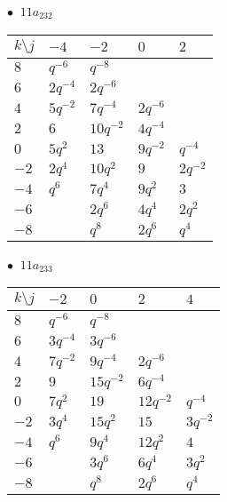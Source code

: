 \begin{minipage}{\linewidth}
$\bullet\ $ $11a_{232}$ \vspace{0.5em} \\
\begin{tabular}{l|llll}
$k \setminus j$ & $-4$ & $-2$ & $0$ & $2$ \\
\hline
$8$ & $q^{-6}$ & $q^{-8}$ &  &  \\
$6$ & $2q^{-4}$ & $2q^{-6}$ &  &  \\
$4$ & $5q^{-2}$ & $7q^{-4}$ & $2q^{-6}$ &  \\
$2$ & $6$ & $10q^{-2}$ & $4q^{-4}$ &  \\
$0$ & $5q^{2}$ & $13$ & $9q^{-2}$ & $q^{-4}$ \\
$-2$ & $2q^{4}$ & $10q^{2}$ & $9$ & $2q^{-2}$ \\
$-4$ & $q^{6}$ & $7q^{4}$ & $9q^{2}$ & $3$ \\
$-6$ &  & $2q^{6}$ & $4q^{4}$ & $2q^{2}$ \\
$-8$ &  & $q^{8}$ & $2q^{6}$ & $q^{4}$ \\
\end{tabular}
\vspace{2em}
\end{minipage}
%
\begin{minipage}{\linewidth}
$\bullet\ $ $11a_{233}$ \vspace{0.5em} \\
\begin{tabular}{l|llll}
$k \setminus j$ & $-2$ & $0$ & $2$ & $4$ \\
\hline
$8$ & $q^{-6}$ & $q^{-8}$ &  &  \\
$6$ & $3q^{-4}$ & $3q^{-6}$ &  &  \\
$4$ & $7q^{-2}$ & $9q^{-4}$ & $2q^{-6}$ &  \\
$2$ & $9$ & $15q^{-2}$ & $6q^{-4}$ &  \\
$0$ & $7q^{2}$ & $19$ & $12q^{-2}$ & $q^{-4}$ \\
$-2$ & $3q^{4}$ & $15q^{2}$ & $15$ & $3q^{-2}$ \\
$-4$ & $q^{6}$ & $9q^{4}$ & $12q^{2}$ & $4$ \\
$-6$ &  & $3q^{6}$ & $6q^{4}$ & $3q^{2}$ \\
$-8$ &  & $q^{8}$ & $2q^{6}$ & $q^{4}$ \\
\end{tabular}
\vspace{2em}
\end{minipage}
%
